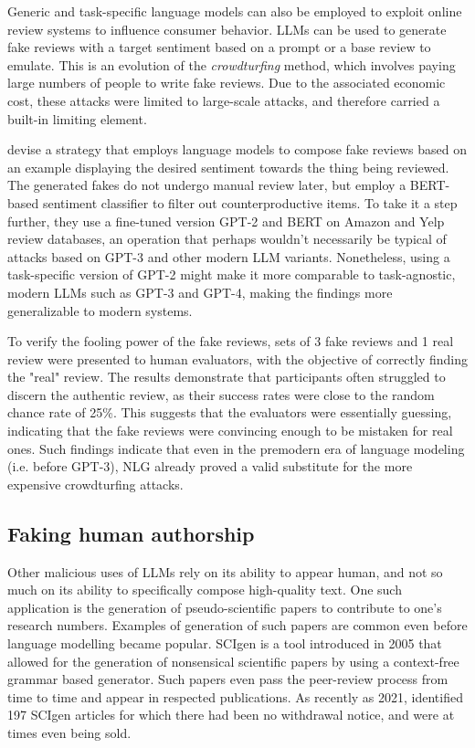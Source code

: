 Generic and task-specific language models can also be employed to exploit online review systems to influence consumer behavior. LLMs can be used to generate fake reviews with a target sentiment based on a prompt or a base review to emulate.
This is an evolution of the \emph{crowdturfing} method, which involves paying large numbers of people to write fake reviews.
Due to the associated economic cost, these attacks were limited to large-scale attacks, and therefore carried a built-in limiting element.

\citet{adelani2019reviews} devise a strategy that employs language models to compose fake reviews based on an example displaying the desired sentiment towards the thing being reviewed.
The generated fakes do not undergo manual review later, but employ a BERT-based sentiment classifier to filter out counterproductive items.
To take it a step further, they use a fine-tuned version GPT-2 and BERT on Amazon and Yelp review databases, an operation that perhaps wouldn't necessarily be typical of attacks based on GPT-3 and other modern LLM variants.
Nonetheless, using a task-specific version of GPT-2 might make it more comparable to task-agnostic, modern LLMs such as GPT-3 and GPT-4, making the findings more generalizable to modern systems.

To verify the fooling power of the fake reviews, sets of 3 fake reviews and 1 real review were presented to human evaluators, with the objective of correctly finding the "real" review.
The results demonstrate that participants often struggled to discern the authentic review, as their success rates were close to the random chance rate of 25\%.
This suggests that the evaluators were essentially guessing, indicating that the fake reviews were convincing enough to be mistaken for real ones.
Such findings indicate that even in the premodern era of language modeling (i.e. before GPT-3), NLG already proved a valid substitute for the more expensive crowdturfing attacks.

\subsection{Faking human authorship}

Other malicious uses of LLMs rely on its ability to appear human, and not so much on its ability to specifically compose high-quality text.
One such application is the generation of pseudo-scientific papers to contribute to one's research numbers.
Examples of generation of such papers are common even before language modelling became popular.
SCIgen \citep{hargrave2005scigen} is a tool introduced in 2005 that allowed for the generation of nonsensical scientific papers by using a context-free grammar based generator.
Such papers even pass the peer-review process from time to time and appear in respected publications.
As recently as 2021, \citet{cabanac2021prevalence} identified 197 SCIgen articles for which there had been no withdrawal notice, and were at times even being sold.

